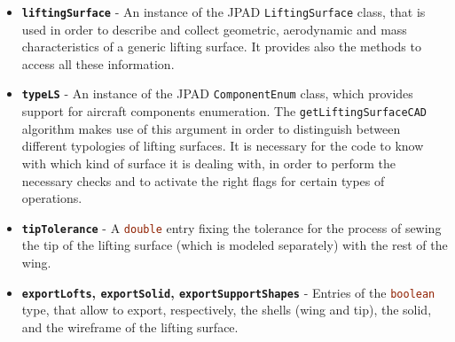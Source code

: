 \begin{itemize} 
\renewcommand\labelitemi{\tiny$\blacksquare$}
\renewcommand\labelitemii{\tiny$\bullet$}
\item \textbf{\lstinline[language=Java]!liftingSurface!} - An instance of the JPAD \lstinline[language=Java]!LiftingSurface! class, that is used in order to describe and collect geometric, aerodynamic and mass characteristics of a generic lifting surface. It provides also the methods to access all these information.
\item \textbf{\lstinline[language=Java]!typeLS!} - An instance of the JPAD \lstinline[language=Java]!ComponentEnum! class, which provides support for aircraft components enumeration. The \lstinline[language=Java]!getLiftingSurfaceCAD! algorithm makes use of this argument in order to distinguish between different typologies of lifting surfaces. It is necessary for the code to know with which kind of surface it is dealing with, in order to perform the necessary checks and to activate the right flags for certain types of operations.
\item \textbf{\lstinline[language=Java]!tipTolerance!} - A \lstinline[language=Java]!double! entry fixing the tolerance for the process of sewing the tip of the lifting surface (which is modeled separately) with the rest of the wing.
\item \textbf{\lstinline[language=Java]!exportLofts!, \lstinline[language=Java]!exportSolid!, \lstinline[language=Java]!exportSupportShapes!} - Entries of the \lstinline[language=Java]!boolean! type, that allow to export, respectively, the shells (wing and tip), the solid, and the wireframe of the lifting surface.
\end{itemize}
%
\noindent
